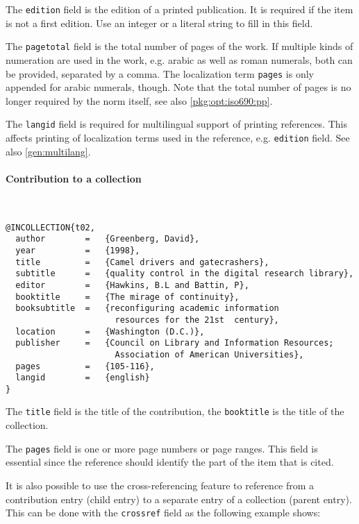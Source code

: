\documentclass[a4paper,10pt]{ltxdockit}
\def\t|#1|{\texttt{#1}}
\def\c#1{%
\hangpara{3em}{1}%
\fullcite{#1}}
\begin{document}
The \t|edition| field is the edition of a printed publication. It is required
if the item is not a first edition. Use an integer or a literal string to fill
in this field.

The \t|pagetotal| field is the total number of pages of the work. If multiple
kinds of numeration are used in the work, e.g. arabic as well as roman numerals,
both can be provided, separated by a comma. The localization term \t|pages| is 
only appended for arabic numerals, though. Note that the total number of pages
is no longer required by the norm itself, see also \ref{pkg:opt:iso690:pp}.

The \t|langid| field is required for multilingual support of printing
references. This affects printing of localization terms used in the reference,
e.g. \t|edition| field. See also \ref{gen:multilang}.

\paragraph{Contribution to a collection} \hfill\\

\c{t02}
\begin{verbatim}
@INCOLLECTION{t02,
  author        =   {Greenberg, David}, 
  year          =   {1998},
  title         =   {Camel drivers and gatecrashers},
  subtitle      =   {quality control in the digital research library},
  editor        =   {Hawkins, B.L and Battin, P},
  booktitle     =   {The mirage of continuity},
  booksubtitle  =   {reconfiguring academic information 
                      resources for the 21st  century}, 
  location      =   {Washington (D.C.)}, 
  publisher     =   {Council on Library and Information Resources; 
                      Association of American Universities}, 
  pages         =   {105-116},
  langid        =   {english}
}
\end{verbatim} 

The \t|title| field is the title of the contribution, the \t|booktitle|
is the title of the collection.

The \t|pages| field is one or more page numbers or page ranges. This field
is essential since the reference should identify the part of the item
that is cited.

It is also possible to use the cross-referencing feature to reference
from a contribution entry (child entry) to a separate entry of a collection
(parent entry). This can be done with the \t|crossref| field
as the following example shows:
\newline
\end{document}
